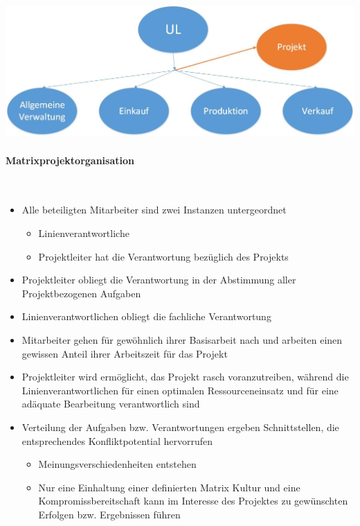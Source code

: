 \includegraphics[scale=0.3]{pictures/lf02-pic/lf02-projektkoordination.jpg}

\paragraph{Matrixprojektorganisation}~\\
\begin{itemize}
	\item Alle beteiligten Mitarbeiter sind zwei Instanzen untergeordnet
	\begin{itemize}
		\item Linienverantwortliche
		\item Projektleiter hat die Verantwortung bezüglich des Projekts
	\end{itemize}
	\item Projektleiter obliegt die Verantwortung in der Abstimmung aller Projektbezogenen Aufgaben
	\item Linienverantwortlichen obliegt die fachliche Verantwortung
	\item Mitarbeiter gehen für gewöhnlich ihrer Basisarbeit nach und arbeiten einen gewissen Anteil ihrer Arbeitszeit für das Projekt
	\item Projektleiter wird ermöglicht, das Projekt rasch voranzutreiben, während die Linienverantwortlichen für einen optimalen Ressourceneinsatz und für eine adäquate Bearbeitung verantwortlich sind
	\item Verteilung der Aufgaben bzw. Verantwortungen ergeben Schnittstellen, die entsprechendes Konfliktpotential hervorrufen
	\begin{itemize}
		\item Meinungsverschiedenheiten entstehen
		\item Nur eine Einhaltung einer definierten Matrix Kultur und eine Kompromissbereitschaft kann im Interesse des Projektes zu gewünschten Erfolgen bzw. Ergebnissen führen
	\end{itemize}
\end{itemize}

